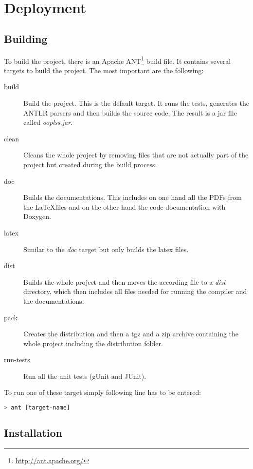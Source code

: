 \chapter{Deployment}

\section{Building}

To build the project, there is an Apache ANT\footnote{\href{http://ant.apache.org/}{http://ant.apache.org/}}
build file. It contains several targets to build the project.
The most important are the following: 

\begin{description}
\item[build] Build the project. This is the default target. It runs
the tests, generates the ANTLR parsers and then builds the source
code. The result is a jar file called \emph{ooplss.jar}.
\item[clean] Cleans the whole project by removing files that are not
actually part of the project but created during the build process.
\item[doc] Builds the documentations. This includes on one hand all
the PDFs from the \LaTeX files and on the other hand the code
documentation with Doxygen.
\item[latex] Similar to the \emph{doc} target but only builds the
latex files.
\item[dist] Builds the whole project and then moves the
according file to a \emph{dist} directory, which then
includes all files needed for running the compiler and the documentations.
\item[pack] Creates the distribution and then a tgz and a zip archive containing
the whole project including the distribution folder.
\item[run-tests] Run all the unit tests (gUnit and JUnit).
\end{description}

To run one of these target simply following line has to be entered:
\begin{lstlisting}[numbers=none,language=bash,caption=Running the ant build system]
> ant [target-name]
\end{lstlisting}

\section{Installation}

